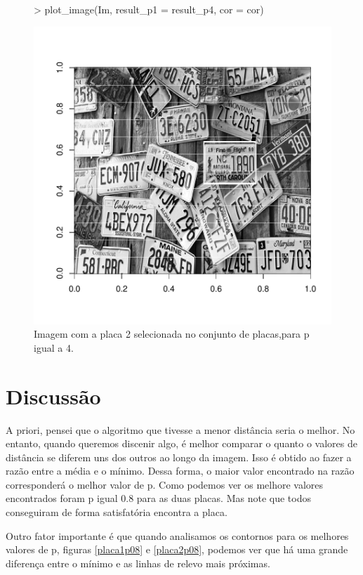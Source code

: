 \documentclass[12pt]{article}
\begin{document}
\begin{figure}
\centering
\begin{Schunk}
\begin{Sinput}
> plot_image(Im, result_p1 = result_p4, cor = cor)
\end{Sinput}
\end{Schunk}
\includegraphics{template_matching-028}
\caption{Imagem com a placa 2 selecionada no conjunto de placas,para p igual a 4.}
\label{placa2selecionada}
\end{figure}

\section{Discussão}
    \par A priori, pensei que o algoritmo que tivesse a menor distância seria o melhor. No entanto, quando queremos discenir algo, é melhor comparar o quanto o valores de distância se diferem uns dos outros ao longo da imagem. Isso é obtido ao fazer a razão entre a média e o mínimo. Dessa forma, o maior valor encontrado na razão corresponderá o melhor valor de p.  Como podemos ver os melhore valores encontrados foram p igual 0.8 para as duas placas. Mas note que todos conseguiram de forma satisfatória encontra a placa. 
    
    \par Outro fator importante é que quando analisamos os contornos para os melhores valores de p, figuras \ref{placa1p08} e \ref{placa2p08}, podemos ver que há uma grande diferença entre o mínimo e as linhas de relevo mais próximas.
    
\end{document}

